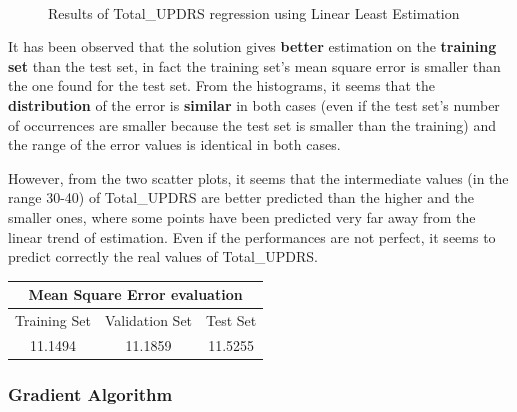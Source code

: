 \documentclass[12pt,a4paper,oneside]{article}
\begin{document}
\begin{figure}[p]
		\\
		
		\caption{Results of Total\_UPDRS regression using Linear Least Estimation}
		\label{fig:Figure 2}
	\end{figure}
	
	It has been observed that the solution gives \textbf{better} estimation on the \textbf{training set} than the test set, in fact the training set's mean square error is smaller than the one found for the test set. From the histograms, it seems that the \textbf{distribution} of the error is \textbf{similar} in both cases (even if the test set's number of occurrences are smaller because the test set is smaller than the training) and the range of the error values is identical in both cases.
	
	However, from the two scatter plots, it seems that the intermediate values (in the range 30-40) of Total\_UPDRS are better predicted than the higher and the smaller ones, where some points have been predicted very far away from the linear trend of estimation. Even if the performances are not perfect, it seems to predict correctly the real values of Total\_UPDRS.
	
	\begin{center}
		\begin{tabular}{ccc}	
			\toprule 
			\multicolumn{3}{c}{\textbf{Mean Square Error evaluation}} \\ 
			\midrule 
			Training Set & Validation Set & Test Set \\ 
			\midrule 
			11.1494 & 11.1859 & 11.5255  \\ 
			\bottomrule 
		\end{tabular} 
	\end{center}
		
	\subsubsection{Gradient Algorithm}
\end{document}
